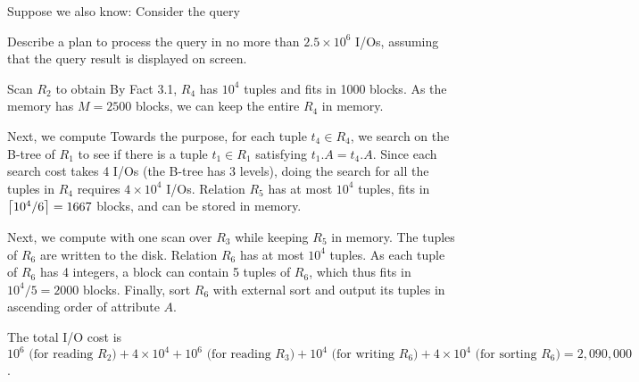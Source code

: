 Suppose we also know:
Consider the query



\noindent Describe a plan to process the query in no more than $2.5 \times 10^6$ I/Os, assuming that the query result is displayed on screen.


\begin{sol}
    Scan $R_2$ to obtain
    By Fact 3.1, $R_4$ has $10^4$ tuples and fits in 1000 blocks. As the memory has $M = 2500$ blocks, we can keep the entire $R_4$ in memory.

    \vgap

    Next, we compute
    Towards the purpose, for each tuple $t_4 \in R_4$, we search on the B-tree of $R_1$ to see if there is a tuple $t_1 \in R_1$ satisfying $t_1.A = t_4.A$. Since each search cost takes 4 I/Os (the B-tree has 3 levels), doing the search for all the tuples in $R_4$ requires $4 \times 10^4$ I/Os. Relation $R_5$ has at most $10^4$ tuples, fits in $\left \lceil 10^4 / 6 \right \rceil = 1667$ blocks, and can be stored in memory.

    \vgap

    Next, we compute
    with one scan over $R_3$ while keeping $R_5$ in memory. The tuples of $R_6$ are written to the disk.
    Relation $R_6$ has at most $10^4$ tuples. As each tuple of $R_6$ has 4 integers, a block can contain 5 tuples of $R_6$, which thus fits in $10^4 / 5 = 2000$ blocks.  Finally, sort $R_6$ with external sort and output its tuples in ascending order of attribute $A$.

    \vgap

    The total I/O cost is $10^6 \text{ (for reading $R_2$)} + 4 \times 10^4 + 10^6 \text{ (for reading $R_3$)} + 10^4 \text{ (for writing $R_6$)} + 4 \times 10^4 \text{ (for sorting $R_6$)} = 2,090,000$.
\end{sol}

